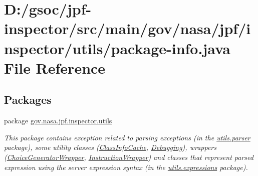 \hypertarget{utils_2package-info_8java}{}\section{D\+:/gsoc/jpf-\/inspector/src/main/gov/nasa/jpf/inspector/utils/package-\/info.java File Reference}
\label{utils_2package-info_8java}
\subsection*{Packages}
\begin{DoxyCompactItemize}
\item 
package \hyperlink{namespacegov_1_1nasa_1_1jpf_1_1inspector_1_1utils}{gov.\+nasa.\+jpf.\+inspector.\+utils}
\begin{DoxyCompactList}\small\item\em This package contains exception related to parsing exceptions (in the \hyperlink{namespacegov_1_1nasa_1_1jpf_1_1inspector_1_1utils_1_1parser}{utils.\+parser} package), some utility classes (\hyperlink{classgov_1_1nasa_1_1jpf_1_1inspector_1_1utils_1_1_class_info_cache}{Class\+Info\+Cache}, \hyperlink{classgov_1_1nasa_1_1jpf_1_1inspector_1_1utils_1_1_debugging}{Debugging}), wrappers (\hyperlink{classgov_1_1nasa_1_1jpf_1_1inspector_1_1utils_1_1_choice_generator_wrapper}{Choice\+Generator\+Wrapper}, \hyperlink{classgov_1_1nasa_1_1jpf_1_1inspector_1_1utils_1_1_instruction_wrapper}{Instruction\+Wrapper}) and classes that represent parsed expression using the server expression syntax (in the \hyperlink{namespacegov_1_1nasa_1_1jpf_1_1inspector_1_1utils_1_1expressions}{utils.\+expressions} package). \end{DoxyCompactList}\end{DoxyCompactItemize}
